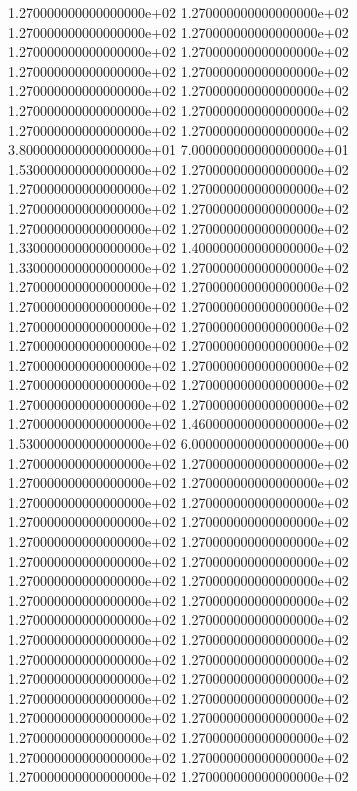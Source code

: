 1.270000000000000000e+02 1.270000000000000000e+02 1.270000000000000000e+02 1.270000000000000000e+02 1.270000000000000000e+02 1.270000000000000000e+02 1.270000000000000000e+02 1.270000000000000000e+02 1.270000000000000000e+02 1.270000000000000000e+02 1.270000000000000000e+02 1.270000000000000000e+02 1.270000000000000000e+02 1.270000000000000000e+02 3.800000000000000000e+01 7.000000000000000000e+01 1.530000000000000000e+02 1.270000000000000000e+02 1.270000000000000000e+02 1.270000000000000000e+02 1.270000000000000000e+02 1.270000000000000000e+02 1.270000000000000000e+02 1.270000000000000000e+02 1.330000000000000000e+02 1.400000000000000000e+02 1.330000000000000000e+02 1.270000000000000000e+02 1.270000000000000000e+02 1.270000000000000000e+02 1.270000000000000000e+02 1.270000000000000000e+02 1.270000000000000000e+02 1.270000000000000000e+02 1.270000000000000000e+02 1.270000000000000000e+02 1.270000000000000000e+02 1.270000000000000000e+02 1.270000000000000000e+02 1.270000000000000000e+02 1.270000000000000000e+02 1.270000000000000000e+02 1.270000000000000000e+02 1.460000000000000000e+02 1.530000000000000000e+02 6.000000000000000000e+00 1.270000000000000000e+02 1.270000000000000000e+02 1.270000000000000000e+02 1.270000000000000000e+02 1.270000000000000000e+02 1.270000000000000000e+02 1.270000000000000000e+02 1.270000000000000000e+02 1.270000000000000000e+02 1.270000000000000000e+02 1.270000000000000000e+02 1.270000000000000000e+02 1.270000000000000000e+02 1.270000000000000000e+02 1.270000000000000000e+02 1.270000000000000000e+02 1.270000000000000000e+02 1.270000000000000000e+02 1.270000000000000000e+02 1.270000000000000000e+02 1.270000000000000000e+02 1.270000000000000000e+02 1.270000000000000000e+02 1.270000000000000000e+02 1.270000000000000000e+02 1.270000000000000000e+02 1.270000000000000000e+02 1.270000000000000000e+02 1.270000000000000000e+02 1.270000000000000000e+02 1.270000000000000000e+02 1.270000000000000000e+02 1.270000000000000000e+02 1.270000000000000000e+02
